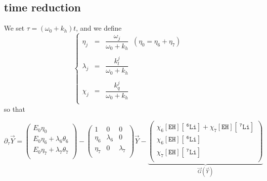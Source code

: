 \documentclass[aps,onecolumn,11pt]{revtex4}
\newcommand{\mychem}[1]{\mathtt{#1}}
\newcommand{\myconc}[1]{\left\lbrack{#1}\right\rbrack}
\newcommand{\spLi}[1]{{~^{\mychem{#1}}\mychem{Li}}}
\newcommand{\Li}[1]{\myconc{\spLi{#1}}}
\newcommand{\spEHin}{\mychem{EH}}
\newcommand{\EHin}{\myconc{\spEHin}}
\begin{document}
\subsection{time reduction}
We set $\tau = \left(\omega_0+k_h\right) t$, and we define
\begin{equation}
	\left\lbrace
	\begin{array}{rcl}
	\eta_j    & = & \dfrac{\omega_j}{\omega_0+k_h}\;\;(\eta_0=\eta_6+\eta_7)\\
	\\
	\lambda_j & = & \dfrac{k_l^j}{\omega_0+k_h}   \\
	\\
	\chi_j    & = & \dfrac{k_q^j}{\omega_0+k_h}   \\
	\end{array}
	\right.
\end{equation}
so that


\begin{equation}
	\partial_\tau \vec{Y} = 
	\begin{pmatrix}
		E_0 \eta_0 \\
		E_0 \eta_6 + \lambda_6 \theta_6\\
		E_0 \eta_7 + \lambda_7 \theta_7\\
	\end{pmatrix}
	-
	\begin{pmatrix}
	1&0&0\\
	\eta_6&\lambda_6&0\\
	\eta_7&0&\lambda_7\\
	\end{pmatrix} 
	\vec{Y}
	-
	\underbrace{
	\begin{pmatrix}
	\chi_6 \EHin \Li{6} + \chi_7 \EHin \Li{7}\\
	\chi_6 \EHin \Li{6} \\
	\chi_7 \EHin \Li{7} \\
	\end{pmatrix}
	}_{\vec{G}\left(\vec{Y}\right)}
\end{equation}
\end{document}
